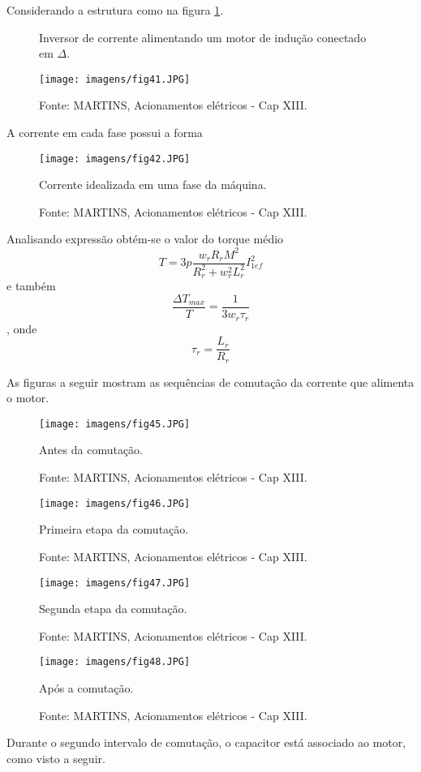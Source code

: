 Considerando a estrutura como na figura \ref{fig:fig41}.

\begin{figure}[ht!]
\center
\caption{\label{fig:fig41}Inversor de corrente alimentando um motor de indução conectado em $ \Delta $.}
\texttt{[image: imagens/fig41.JPG]}
\caption*{Fonte: MARTINS, Acionamentos elétricos - Cap XIII.}
\end{figure}

A corrente em cada fase possui a forma

\begin{figure}[ht!]
\center
\texttt{[image: imagens/fig42.JPG]}
\caption{\label{fig:fig42} Corrente idealizada em uma fase da máquina.}
\caption*{Fonte: MARTINS, Acionamentos elétricos - Cap XIII.}
\end{figure}

Analisando expressão obtém-se o valor do torque médio
\[ T = 3p\frac{w_rR_rM^2}{R_r^2+w_r^2L_r^2}I_{1ef}^2  \]
e também
\[ \frac{\Delta T_{max}}{T} = \frac{1}{3w_r \tau _r}  \], onde \[  \tau _r = \frac{L_r}{R_r} \]

As figuras a seguir mostram as sequências de comutação da corrente que alimenta o motor.

\begin{figure}[ht!]
\center
\texttt{[image: imagens/fig45.JPG]}
\caption{\label{fig:fig45} Antes da comutação.}
\caption*{Fonte: MARTINS, Acionamentos elétricos - Cap XIII.}
\end{figure}


\begin{figure}[ht!]
\center
\texttt{[image: imagens/fig46.JPG]}
\caption{\label{fig:fig46} Primeira etapa da comutação.}
\caption*{Fonte: MARTINS, Acionamentos elétricos - Cap XIII.}
\end{figure}


\begin{figure}[ht!]
\center
\texttt{[image: imagens/fig47.JPG]}
\caption{\label{fig:fig47} Segunda etapa da comutação.}
\caption*{Fonte: MARTINS, Acionamentos elétricos - Cap XIII.}
\end{figure}


\begin{figure}[ht!]
\center
\texttt{[image: imagens/fig48.JPG]}
\caption{\label{fig:fig48} Após a comutação.}
\caption*{Fonte: MARTINS, Acionamentos elétricos - Cap XIII.}
\end{figure}

Durante o segundo intervalo de comutação, o capacitor está associado ao motor, como visto a seguir.

